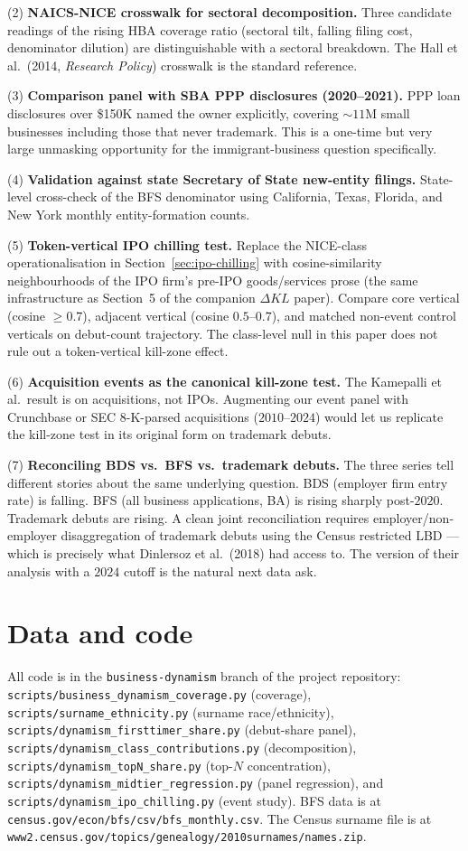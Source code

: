 \documentclass[11pt]{article}
\begin{document}
(2) \textbf{NAICS-NICE crosswalk for sectoral decomposition.}
Three candidate readings of the rising HBA coverage ratio (sectoral
tilt, falling filing cost, denominator dilution) are distinguishable
with a sectoral breakdown. The Hall et al.\ (2014, \emph{Research
Policy}) crosswalk is the standard reference.

(3) \textbf{Comparison panel with SBA PPP disclosures (2020--2021).}
PPP loan disclosures over \$150K named the owner explicitly,
covering $\sim 11$M small businesses including those that never
trademark. This is a one-time but very large unmasking opportunity
for the immigrant-business question specifically.

(4) \textbf{Validation against state Secretary of State new-entity
filings.} State-level cross-check of the BFS denominator using
California, Texas, Florida, and New York monthly entity-formation
counts.

(5) \textbf{Token-vertical IPO chilling test.} Replace the
NICE-class operationalisation in Section~\ref{sec:ipo-chilling}
with cosine-similarity neighbourhoods of the IPO firm's pre-IPO
goods/services prose (the same infrastructure as Section~5 of the
companion $\Delta KL$ paper). Compare core vertical (cosine
$\ge 0.7$), adjacent vertical (cosine $0.5$--$0.7$), and matched
non-event control verticals on debut-count trajectory. The
class-level null in this paper does not rule out a token-vertical
kill-zone effect.

(6) \textbf{Acquisition events as the canonical kill-zone test.}
The Kamepalli et al.\ result is on acquisitions, not IPOs.
Augmenting our event panel with Crunchbase or SEC 8-K-parsed
acquisitions ($2010$--$2024$) would let us replicate the kill-zone
test in its original form on trademark debuts.

(7) \textbf{Reconciling BDS vs.\ BFS vs.\ trademark debuts.}
The three series tell different stories about the same underlying
question. BDS (employer firm entry rate) is falling. BFS (all
business applications, BA) is rising sharply post-$2020$. Trademark
debuts are rising. A clean joint reconciliation requires
employer/non-employer disaggregation of trademark debuts using the
Census restricted LBD --- which is precisely what Dinlersoz et al.\
(2018) had access to. The version of their analysis with a
$2024$ cutoff is the natural next data ask.

\section*{Data and code}
All code is in the \texttt{business-dynamism} branch of the
project repository:
\texttt{scripts/business\_dynamism\_coverage.py} (coverage),
\texttt{scripts/surname\_ethnicity.py} (surname race/ethnicity),
\texttt{scripts/dynamism\_firsttimer\_share.py} (debut-share panel),
\texttt{scripts/dynamism\_class\_contributions.py} (decomposition),
\texttt{scripts/dynamism\_topN\_share.py} (top-$N$ concentration),
\texttt{scripts/dynamism\_midtier\_regression.py} (panel regression),
and
\texttt{scripts/dynamism\_ipo\_chilling.py} (event study).
BFS data is at \texttt{census.gov/econ/bfs/csv/bfs\_monthly.csv}.
The Census surname file is at
\texttt{www2.census.gov/topics/genealogy/2010surnames/names.zip}.
\end{document}
